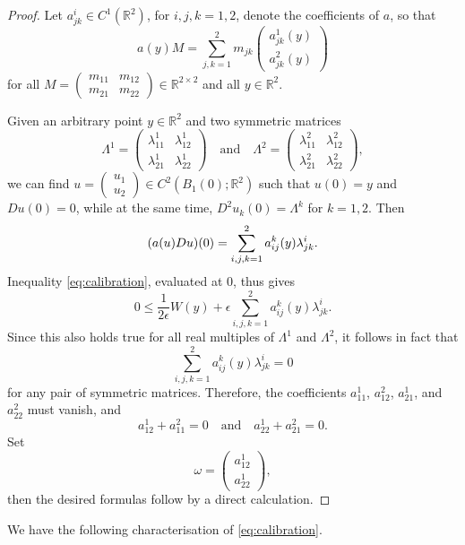 \documentclass[a4paper]{article}
\newcommand{\R}{\mathbb{R}}
\let\div\relax\DeclareMathOperator{\div}{div}
\theoremstyle{definition}
\theoremstyle{remark}
\begin{document}
\begin{proof}
Let $a_{jk}^i \in C^1(\R^2)$, for $i, j, k = 1, 2$, denote the coefficients of $a$, so that
\[
a(y)M = \sum_{j, k = 1}^2 m_{jk} \begin{pmatrix} a_{jk}^1(y) \\ a_{jk}^2(y) \end{pmatrix}
\]
for all $M = (\begin{smallmatrix} m_{11} & m_{12} \\ m_{21} & m_{22} \end{smallmatrix}) \in \R^{2 \times 2}$
and all $y \in \R^2$.

Given an arbitrary point $y \in \R^2$ and two symmetric matrices
\[
\Lambda^1 = \begin{pmatrix} \lambda_{11}^1 & \lambda_{12}^1 \\ \lambda_{21}^1 & \lambda_{22}^1 \end{pmatrix} \quad \text{and} \quad \Lambda^2 = \begin{pmatrix} \lambda_{11}^2 & \lambda_{12}^2 \\ \lambda_{21}^2 & \lambda_{22}^2 \end{pmatrix},
\]
we can find $u = (\begin{smallmatrix} u_1 \\ u_2 \end{smallmatrix}) \in C^2(B_1(0); \R^2)$ such that $u(0) = y$ and
$Du(0) = 0$, while at the same time, $D^2u_k(0) = \Lambda^k$
for $k = 1, 2$. Then
\[
\div(a(u)Du)(0) = \sum_{i, j, k = 1}^2 a_{ij}^k(y) \lambda_{jk}^i.
\]
Inequality \eqref{eq:calibration}, evaluated at $0$, thus gives
\[
0 \le \frac{1}{2\epsilon} W(y) + \epsilon \sum_{i, j, k = 1}^2 a_{ij}^k(y) \lambda_{jk}^i.
\]
Since this also holds true for all real multiples of $\Lambda^1$ and
$\Lambda^2$, it follows in fact that
\[
\sum_{i, j, k = 1}^2 a_{ij}^k(y) \lambda_{jk}^i = 0
\]
for any pair of symmetric matrices. Therefore, the coefficients
$a_{11}^1$, $a_{12}^2$, $a_{21}^1$, and $a_{22}^2$ must vanish, and
\[
a_{12}^1 + a_{11}^2 = 0 \quad \text{and} \quad a_{22}^1 + a_{21}^2 = 0.
\]
Set
\[
\omega = \begin{pmatrix} a_{12}^1 \\ a_{22}^1 \end{pmatrix},
\]
then the desired formulas follow by a direct calculation.
\end{proof}

We have the following characterisation of \eqref{eq:calibration}.
\end{document}
